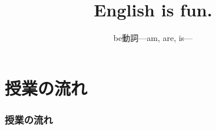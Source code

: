 \documentclass[aspectratio=169,xcolor={dvipsnames,table}]{beamer}
\title{English is fun.}
\subtitle{be動詞---am, are, is---}
\author{}
\institute[]{}
\date[]
\begin{document}
%
%
%
%
\begin{frame}[label=title]
\thispagestyle{empty}
\titlepage
\end{frame}
\section*{授業の流れ}
\begin{frame}[plain]
  \frametitle{授業の流れ}
  \tableofcontents
\end{frame}
\end{document}
